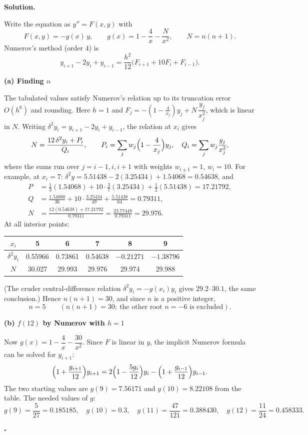 \documentclass[11pt,a4paper]{article}
\newenvironment{solution}
  {\par\noindent\textbf{Solution.}\par\nobreak}
  {\par\hfill\(\square\)\par}
\newcommand{\step}[1]{\par\addvspace{0.5em}\noindent\textbf{#1}\par\nobreak}
\begin{document}
\begin{solution}
Write the equation as \(y''=F(x,y)\) with
\[
  F(x,y)=-g(x)\,y,\qquad
  g(x)=1-\frac4x-\frac{N}{x^2},\qquad N=n(n+1).
\]
Numerov's method (order \(4\)) is
\[
  y_{i+1}-2y_i+y_{i-1}=\frac{h^2}{12}\bigl(F_{i+1}+10F_i+F_{i-1}\bigr).
\]

\step{(a) Finding \(n\)}
The tabulated values satisfy Numerov's relation up to its
truncation error \(O(h^6)\) and rounding.  Here \(h=1\) and
\(F_j=-(1-\frac4{x_j})y_j+N\,\dfrac{y_j}{x_j^2}\), which is linear in
\(N\).  Writing \(\delta^2y_i=y_{i+1}-2y_i+y_{i-1}\), the relation at
\(x_i\) gives
\[
  N=\frac{12\,\delta^2y_i+P_i}{Q_i},\qquad
  P_i=\sum_{j}w_j\Bigl(1-\frac4{x_j}\Bigr)y_j,\quad
  Q_i=\sum_jw_j\frac{y_j}{x_j^2},
\]
where the sums run over \(j=i-1,i,i+1\) with weights
\(w_{i\pm1}=1\), \(w_i=10\).  For example, at \(x_i=7\):
\(\delta^2y=5.51438-2(3.25434)+1.54068=0.54638\), and
\begin{align*}
  P&=\tfrac13(1.54068)+10\cdot\tfrac37(3.25434)+\tfrac12(5.51438)=17.21792,\\
  Q&=\tfrac{1.54068}{36}+10\cdot\tfrac{3.25434}{49}+\tfrac{5.51438}{64}=0.79311,\\
  N&=\frac{12(0.54638)+17.21792}{0.79311}=\frac{23.77448}{0.79311}=29.976 .
\end{align*}
At all interior points:
\begin{center}
\renewcommand{\arraystretch}{1.2}
\begin{tabular}{@{}cccccc@{}}
\toprule
\(x_i\)&5&6&7&8&9\\
\midrule
\(\delta^2y_i\)&0.55966&0.73861&0.54638&\(-0.21271\)&\(-1.38796\)\\
\(N\)&30.027&29.993&29.976&29.974&29.988\\
\bottomrule
\end{tabular}
\end{center}
(The cruder central-difference relation
\(\delta^2y_i=-g(x_i)y_i\) gives \(29.2\)--\(30.1\), the same
conclusion.)  Hence \(n(n+1)=30\), and since \(n\) is a positive
integer,
\[
  \boxed{n=5}\qquad(n(n+1)=30;\ \text{the other root } n=-6 \text{ is excluded}).
\]

\step{(b) \(f(12)\) by Numerov with \(h=1\)}
Now \(g(x)=1-\dfrac4x-\dfrac{30}{x^2}\).  Since \(F\) is linear in
\(y\), the implicit Numerov formula can be solved for \(y_{i+1}\):
\[
  \Bigl(1+\frac{g_{i+1}}{12}\Bigr)y_{i+1}
  =2\Bigl(1-\frac{5g_i}{12}\Bigr)y_i-\Bigl(1+\frac{g_{i-1}}{12}\Bigr)y_{i-1}.
\]
The two starting values are \(y(9)=7.56171\) and \(y(10)=8.22108\) from
the table.  The needed values of \(g\):
\[
  g(9)=\frac{5}{27}=0.185185,\quad
  g(10)=0.3,\quad
  g(11)=\frac{47}{121}=0.388430,\quad
  g(12)=\frac{11}{24}=0.458333 .
\]


\end{solution}
\end{document}
